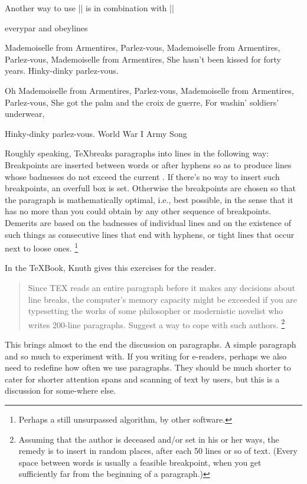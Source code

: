 \bigskip
Another way to use |\obeylines| is in combination with |\everypar|

\begin{texexample}{everypar and obeylines}{}
{\obeylines\everypar{\hfill}\parindent=0pt
Mademoiselle from Armentires, Parlez-vous,
Mademoiselle from Armentires, Parlez-vous,
Mademoiselle from Armentires,
She hasn't been kissed for forty years.
Hinky-dinky parlez-vous.

Oh Mademoiselle from Armentires, Parlez-vous,
Mademoiselle from Armentires, Parlez-vous,
She got the palm and the croix de guerre,
For washin' soldiers' underwear,

Hinky-dinky parlez-vous.
\hfil World War I Army Song\par}
\end{texexample}

Roughly speaking, \TeX breaks paragraphs into lines in the following
way: Breakpoints are inserted between words or after hyphens so as to produce
lines whose badnesses do not exceed the current . If there's no way
to insert such breakpoints, an overfull box is set. Otherwise the breakpoints are
chosen so that the paragraph is mathematically optimal, i.e., best possible, in
the sense that it has no more  than you could obtain by any other
sequence of breakpoints. Demerits are based on the badnesses of individual lines
and on the existence of such things as consecutive lines that end with hyphens,
or tight lines that occur next to loose ones.  \footnote{Perhaps a still unsurpassed algorithm, by other software.}

In the TeXBook, Knuth gives this exercises for the reader. 

\begin{quotation}
Since TEX reads an entire paragraph before it makes any decisions about
line breaks, the computer's memory capacity might be exceeded if you are typesetting
the works of some philosopher or modernistic novelist who writes 200-line paragraphs.
Suggest a way to cope with such authors. \footnote{Assuming that the author is deceased and/or set in his or her ways, the remedy
is to insert {   } in random places, after
each 50 lines or so of text. (Every space between words is usually a feasible breakpoint,
when you get sufficiently far from the beginning of a paragraph.)}
\end{quotation}

This brings almost to the end the discussion on paragraphs. A simple paragraph and so much to experiment with. If you writing for e-readers, perhaps we also need to redefine how often we use paragraphs. They should be much shorter to cater for shorter attention spans and scanning of text by users, but this is a discussion for some-where else.


